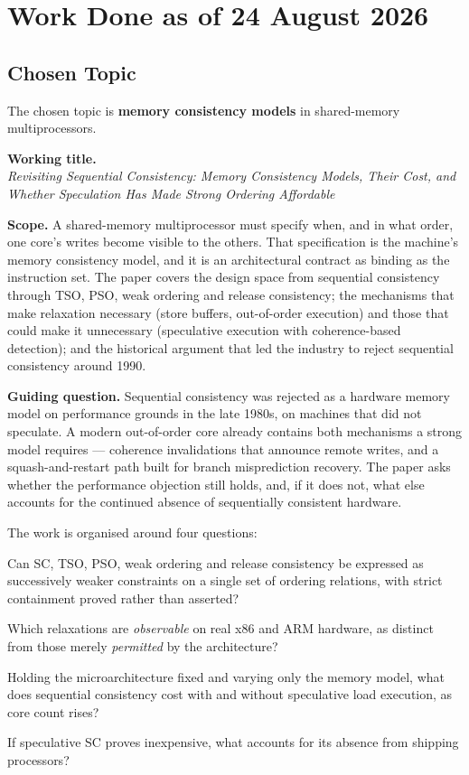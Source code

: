 \section{Work Done as of 24 August 2026}

\subsection{Chosen Topic}

The chosen topic is \textbf{memory consistency models} in shared-memory
multiprocessors.

\medskip
\noindent\textbf{Working title.}\\
\emph{Revisiting Sequential Consistency: Memory Consistency Models, Their Cost,
and Whether Speculation Has Made Strong Ordering Affordable}

\medskip
\noindent\textbf{Scope.}
A shared-memory multiprocessor must specify when, and in what order, one core's
writes become visible to the others.
That specification is the machine's memory consistency model, and it is an
architectural contract as binding as the instruction set.
The paper covers the design space from sequential consistency through TSO, PSO,
weak ordering and release consistency; the mechanisms that make relaxation
necessary (store buffers, out-of-order execution) and those that could make it
unnecessary (speculative execution with coherence-based detection); and the
historical argument that led the industry to reject sequential consistency
around 1990.

\medskip
\noindent\textbf{Guiding question.}
Sequential consistency was rejected as a hardware memory model on performance
grounds in the late 1980s, on machines that did not speculate.
A modern out-of-order core already contains both mechanisms a strong model
requires --- coherence invalidations that announce remote writes, and a
squash-and-restart path built for branch misprediction recovery.
The paper asks whether the performance objection still holds, and, if it does
not, what else accounts for the continued absence of sequentially consistent
hardware.

\medskip
\noindent The work is organised around four questions:

\begin{description}[leftmargin=2.2cm,style=nextline,font=\normalfont\bfseries]
\item[Q1 Formal] Can SC, TSO, PSO, weak ordering and release consistency be
  expressed as successively weaker constraints on a single set of ordering
  relations, with strict containment proved rather than asserted?
\item[Q2 Empirical] Which relaxations are \emph{observable} on real x86 and ARM
  hardware, as distinct from those merely \emph{permitted} by the architecture?
\item[Q3 Quantitative] Holding the microarchitecture fixed and varying only the
  memory model, what does sequential consistency cost with and without
  speculative load execution, as core count rises?
\item[Q4 Interpretive] If speculative SC proves inexpensive, what accounts for
  its absence from shipping processors?
\end{description}

